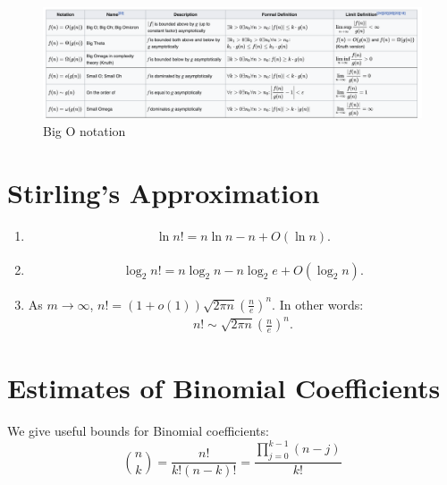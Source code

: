 \documentclass{article}
\begin{document}
\begin{figure}[ht]
 \centering
 \includegraphics[width=1\linewidth]{Figs/big_o.png}
\centering
\caption{Big O notation}
		\label{un:figbigo}
\end{figure}


\section{Stirling's Approximation}
\begin{enumerate}
    \item \begin{align}
        \ln n!=n\ln n-n+O(\ln n).\label{Stirling:1}
    \end{align}
    \item \begin{align}
        \log _{2}n!=n\log _{2}n-n\log _{2}e+O(\log _{2}n).\label{Stirling:2}
    \end{align}
    \item  As $m\to \infty$, $n! = (1+o(1)){\sqrt {2\pi n}}\left({\frac {n}{e}}\right)^{n}$. In other words:
    \begin{align}
         n!\sim {\sqrt {2\pi n}}\left({\frac {n}{e}}\right)^{n}. \label{Stirling:3}
    \end{align}

\end{enumerate}
\section{Estimates of Binomial Coefficients}
We give useful bounds for Binomial coefficients: $$\binom{n}{k}=\frac{n!}{k!(n-k)!} = \frac{\prod_{j=0}^{k-1} (n-j)}{k!}$$
\end{document}
